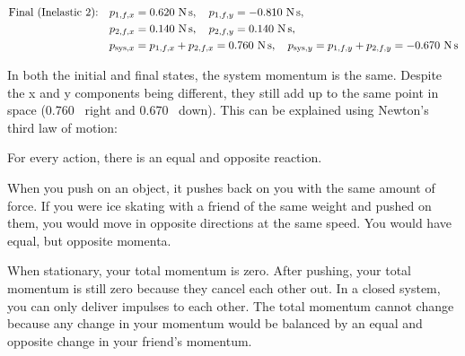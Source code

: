 \begin{align*}
\text{Final (Inelastic 2):}\quad
&p_{1,f,x}=0.620\ \si{\newton\second},\quad p_{1,f,y}=-0.810\ \si{\newton\second},\\
&p_{2,f,x}=0.140\ \si{\newton\second},\quad p_{2,f,y}=0.140\ \si{\newton\second},\\
&p_{\mathrm{sys},x}=p_{1,f,x}+p_{2,f,x}=0.760\ \si{\newton\second},\quad
p_{\mathrm{sys},y}=p_{1,f,y}+p_{2,f,y}=-0.670\ \si{\newton\second}
\end{align*}

In both the initial and final states, the system momentum is the same. Despite the x and y components being different, they still add up to the same point in space (0.760 \ns~right and 0.670 \ns~down). This can be explained using Newton's third law of motion:

\begin{center}
For every action, there is an equal and opposite reaction.
\end{center}

When you push on an object, it pushes back on you with the same amount of force. If you were ice skating with a friend of the same weight and pushed on them, you would move in opposite directions at the same speed. You would have equal, but opposite momenta.

When stationary, your total momentum is zero. After pushing, your total momentum is still zero because they cancel each other out. In a closed system, you can only deliver impulses to each other. The total momentum cannot change because any change in your momentum would be balanced by an equal and opposite change in your friend's momentum.